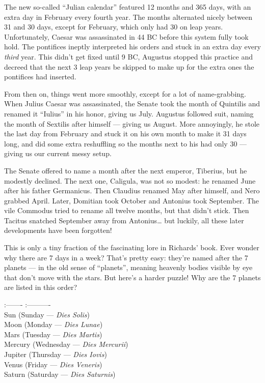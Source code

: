 \documentclass{article}
\begin{document}
The new so-called ``Julian calendar'' featured 12 months and 365 days,
with an extra day in February every fourth year. The months alternated
nicely between 31 and 30 days, except for February, which only had 30 on
leap years. Unfortunately, Caesar was assassinated in 44 BC before this
system fully took hold. The pontifices ineptly interpreted his orders
and stuck in an extra day every \emph{third} year. This didn't get fixed
until 9 BC, Augustus stopped this practice and decreed that the next 3
leap years be skipped to make up for the extra ones the pontifices had
inserted.

From then on, things went more smoothly, except for a lot of
name-grabbing. When Julius Caesar was assassinated, the Senate took the
month of Quintilis and renamed it ``Iulius'' in his honor, giving us
July. Augustus followed suit, naming the month of Sextilis after himself
--- giving us August. More annoyingly, he stole the last day from
February and stuck it on his own month to make it 31 days long, and did
some extra reshuffling so the months next to his had only 30 --- giving
us our current messy setup.

The Senate offered to name a month after the next emperor, Tiberius, but
he modestly declined. The next one, Caligula, was not so modest: he
renamed June after his father Germanicus. Then Claudius renamed May
after himself, and Nero grabbed April. Later, Domitian took October and
Antonius took September. The vile Commodus tried to rename all twelve
months, but that didn't stick. Then Tacitus snatched September away from
Antonius\ldots{} but luckily, all these later developments have been
forgotten!

This is only a tiny fraction of the fascinating lore in Richards' book.
Ever wonder why there are 7 days in a week? That's pretty easy: they're
named after the 7 planets --- in the old sense of ``planets'', meaning
heavenly bodies visible by eye that don't move with the stars. But
here's a harder puzzle! Why are the 7 planets are listed in this order?

:------- \textbar{} :---------- \textbar{}\\
Sun \textbar{} (Sunday --- \emph{Dies Solis}) \textbar{}\\
Moon \textbar{} (Monday --- \emph{Dies Lunae}) \textbar{}\\
Mars \textbar{} (Tuesday --- \emph{Dies Martis}) \textbar{}\\
Mercury \textbar{} (Wednesday --- \emph{Dies Mercurii}) \textbar{}\\
Jupiter \textbar{} (Thursday --- \emph{Dies Iovis}) \textbar{}\\
Venus \textbar{} (Friday --- \emph{Dies Veneris}) \textbar{}\\
Saturn \textbar{} (Saturday --- \emph{Dies Saturnis}) \textbar{}
\end{document}
